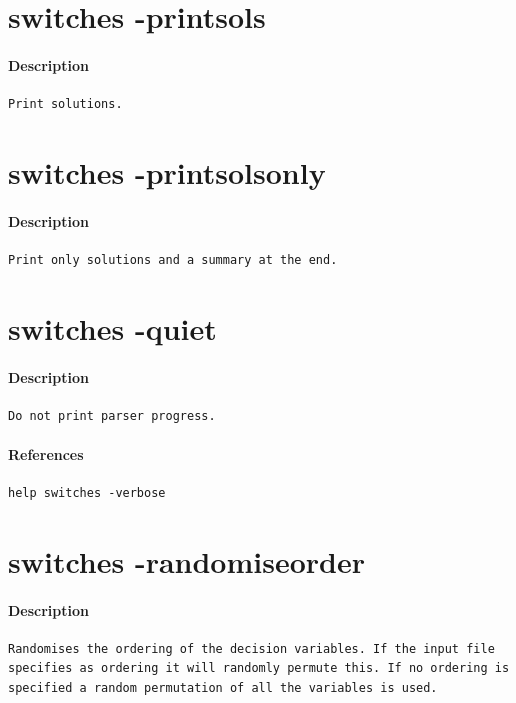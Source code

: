 \documentclass[oneside]{book}
\begin{document}
\section{switches -printsols}
\paragraph{Description}
{\footnotesize
\begin{verbatim}
Print solutions.
\end{verbatim}
}
\section{switches -printsolsonly}
\paragraph{Description}
{\footnotesize
\begin{verbatim}
Print only solutions and a summary at the end.
\end{verbatim}
}
\section{switches -quiet}
\paragraph{Description}
{\footnotesize
\begin{verbatim}
Do not print parser progress.
\end{verbatim}
}
\paragraph{References}
{\footnotesize
\begin{verbatim}
help switches -verbose
\end{verbatim}
}
\section{switches -randomiseorder}
\paragraph{Description}
{\footnotesize
\begin{verbatim}
Randomises the ordering of the decision variables. If the input file
specifies as ordering it will randomly permute this. If no ordering is
specified a random permutation of all the variables is used.
\end{verbatim}
}
\end{document}
